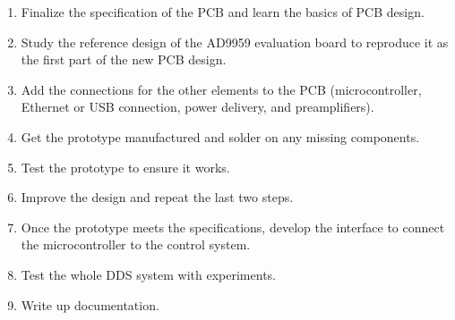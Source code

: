 \documentclass[10pt]{article}
\begin{document}
\begin{enumerate}
	\item
	      Finalize the specification of the PCB and learn the basics of PCB design.

	\item
	      Study the reference design of the AD9959 evaluation board to reproduce it as the first part of the new PCB design.

	\item
	      Add the connections for the other elements to the PCB (microcontroller, Ethernet or USB connection, power delivery, and preamplifiers).

	\item
	      Get the prototype manufactured and solder on any missing components.

	\item
	      Test the prototype to ensure it works.

	\item
	      Improve the design and repeat the last two steps.

	\item
	      Once the prototype meets the specifications, develop the interface to connect the microcontroller to the control system.

	\item
	      Test the whole DDS system with experiments.

	\item
	      Write up documentation.

\end{enumerate}

\printbibliography[heading=bibintoc,title={Bibliography}]
\end{document}
